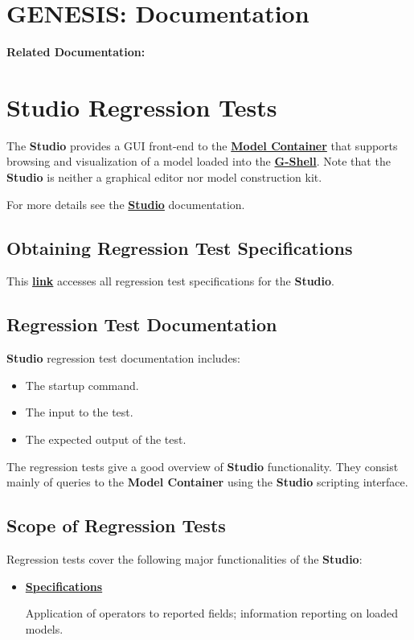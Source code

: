 \documentclass[12pt]{article}
\begin{document}
\section*{GENESIS: Documentation}

{\bf Related Documentation:}

\section*{Studio Regression Tests}

The {\bf Studio} provides a GUI front-end to the \href{../model-container/model-container.tex}{\bf Model Container} that supports browsing and visualization of a model loaded into the \href{../gshell/gshell.tex}{\bf G-Shell}. Note that the {\bf Studio} is neither a graphical editor nor model construction kit.

For more details see the \href{../studio/studio.tex}{\bf Studio} documentation.

\subsection*{Obtaining Regression Test Specifications}

This \href{http://www.neurospaces.org/neurospaces_project/studio/tests/html/index.html}{\bf link} accesses all regression test specifications for the {\bf Studio}.

\subsection*{Regression Test Documentation}

{\bf Studio} regression test documentation includes:
\begin{itemize}
\item The startup command.
\item The input to the test.
\item The expected output of the test.
\end{itemize}
The regression tests give a good overview of {\bf Studio} functionality. They consist mainly of queries to the {\bf Model Container} using the {\bf Studio} scripting interface.

\subsection*{Scope of Regression Tests}

Regression tests cover the following major functionalities of the {\bf Studio}:
\begin{itemize}

\item[]\href{http://www.neurospaces.org/neurospaces_project/studio/tests/html/specifications/main.html}{\bf Specifications}

Application of operators to reported fields; information reporting on loaded models.

\end{itemize}
\end{document}
